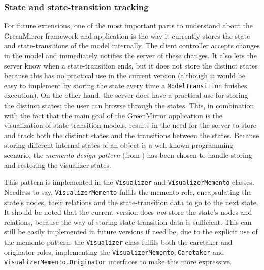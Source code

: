 \documentclass[a4paper]{article}
\begin{document}
\subsubsection{State and state-transition tracking}\label{subsubsec:statetransitiontracking}
For future extensions, one of the most important parts to understand about the GreenMirror framework and application is the way it currently stores the state and state-transitions of the model internally. The client controller accepts changes in the model and immediately notifies the server of these changes. It also lets the server know when a state-transition ends, but it does not store the distinct states because this has no practical use in the current version (although it would be easy to implement by storing the state every time a \lstinline{ModelTransition} finishes execution). On the other hand, the server does have a practical use for storing the distinct states: the user can browse through the states. This, in combination with the fact that the main goal of the GreenMirror application is the visualization of state-transition models, results in the need for the server to store and track both the distinct states and the transitions between the states. Because storing different internal states of an object is a well-known programming scenario, the \emph{memento design pattern} (from \cite{kuchana2004,sourcemaking}) has been chosen to handle storing and restoring the visualizer states.

This pattern is implemented in the \lstinline{Visualizer} and \lstinline{VisualizerMemento} classes. Needless to say, \lstinline{VisualizerMemento} fulfils the memento role, encapsulating the state's nodes, their relations and the state-transition data to go to the next state. It should be noted that the current version does \emph{not} store the state's nodes and relations, because the way of storing state-transition data is sufficient. This can still be easily implemented in future versions if need be, due to the explicit use of the memento pattern: the \lstinline{Visualizer} class fulfils both the caretaker and originator roles, implementing the \lstinline{VisualizerMemento.Caretaker} and \lstinline{VisualizerMemento.Originator} interfaces to make this more expressive.
\end{document}
